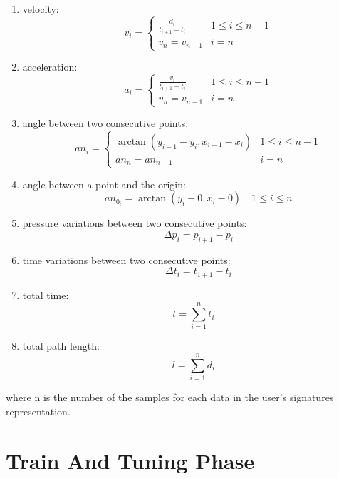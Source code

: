 \documentclass[a4paper, 10pt, conference]{IEEEconf}
\begin{document}
	\begin{enumerate}[label=(\roman*)]
		\item 
    		velocity:
    		\[ \quad v_i = 
   			\left\{
      		\begin{array}{ll}
        		\frac{d_i}{t_{i+1}-t_i} & 1\leq i\leq n-1 \\
        		v_n=v_{n-1} & i = n
      		\end{array}
   	 		\right.\]
    	\item 
    		acceleration:
    		\[ \quad a_i =
    		\left\{
      			\begin{array}{ll}
        		\frac{v_i}{t_{i+1}-t_i} & 1\leq i\leq n-1 \\
        		v_n = v_{n-1} & i = n
      		\end{array}
    		\right.\]
    	\item
    		angle between two consecutive points:
    		\[ \quad an_i =
    		\left\{
      			\begin{array}{ll}
        		\arctan(y_{i+1}-y_i,x_{i+1}-x_i) & 1\leq i\leq n-1 \\
        		an_n = an_{n-1} & i = n
      		\end{array}
    		\right.\]
    	\item
    		angle between a point and the origin:
    		\[ \quad an_{0_i} = \arctan(y_i-0,x_i-0) \quad 1\leq i\leq n \]
    	\item 
    		pressure variations between two consecutive points:
    		\[ \quad \Delta{p_i} = p_{i+1}-p_i \]
    	\item 
    		time variations between two consecutive points:
    		\[ \quad \Delta{t_i} = t_{1+1}-t_i \]
    	\item
    		total time:
    		\[ t = \sum_{i=1}^n t_i \]
    	\item
    		total path length:
    		\[ l = \sum_{i=1}^n d_i \]
  	\end{enumerate}
where n is the number of the samples for each data in the user's signatures representation.

\section{Train And Tuning Phase}
\end{document}
